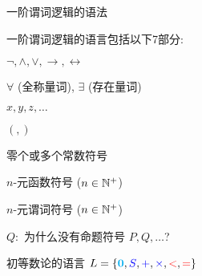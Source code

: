 
\begin{frame}{}
  \begin{center}

    \vspace{0.60cm}
    一阶谓词逻辑的语法
  \end{center}
\end{frame}

\begin{frame}{}
  \begin{definition}[命题逻辑的语言]
    一阶谓词逻辑的语言包括以下7部分: \\[5pt]
    \begin{description}
      \setlength{\itemsep}{5pt}
      \item [逻辑联词:] $\lnot, \land, \lor, \to, \leftrightarrow$
      \item [\red{量词符号:}] $\forall$ (全称量词), $\exists$ (存在量词)
      \item [变元符号:] $x, y, z, \dots$
      \item [左右括号:] $(, )$
      \item [\cyan{常数符号:}] 零个或多个常数符号
      \item [\blue{函数符号:}] $n$-元函数符号 ($n \in \mathbb{N}^{+}$)
      \item [\red{谓词符号:}] $n$-元谓词符号 ($n \in \mathbb{N}^{+}$)
    \end{description}
  \end{definition}

  \pause
  \begin{center}
    $Q:$ 为什么没有命题符号 $P, Q, \dots$?
  \end{center}
\end{frame}

\begin{frame}{}
  \begin{center}
    初等数论的语言 $L = \{\textbf{\textcolor{cyan}{0}},
      \textcolor{blue}{S}, \textcolor{blue}{+}, \textcolor{blue}{\times}, \textcolor{red}{<}, \textcolor{red}{=}\}$
  \end{center}
\end{frame}

